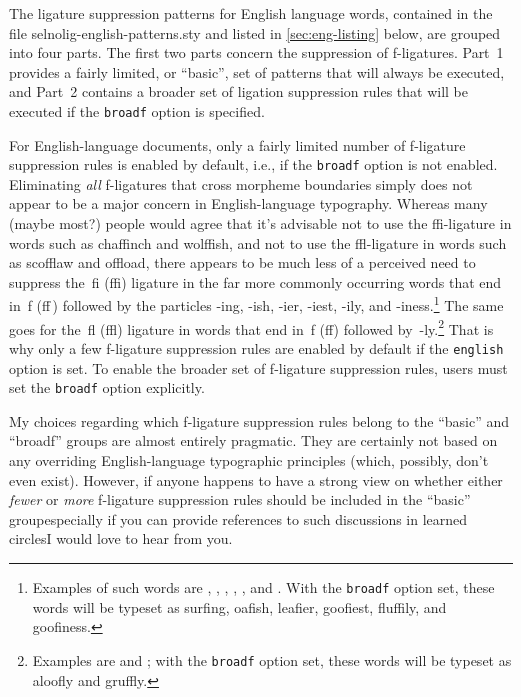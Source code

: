 \documentclass[11pt]{article}
\newcommand{\pkg}[1]{\textsf{#1}}
\newcommand{\opt}[1]{\texttt{#1}}
\begin{document}
The ligature suppression patterns for English language words, contained in the file \pkg{selnolig-english-patterns.sty} and listed in \cref{sec:eng-listing} below, are grouped into four parts. The first two parts concern the suppression of f-ligatures. Part~1 provides a fairly limited, or \enquote{basic}, set of patterns that will always be executed, and Part~2 contains a broader set of ligation suppression rules that will be executed if the \opt{broadf} option is specified. 

For English-language documents, only a fairly limited number of f-ligature suppression rules is enabled by default, i.e., if the \opt{broadf} option is not enabled. Eliminating \emph{all} f-ligatures that cross morpheme boundaries simply does not appear to be a major concern in English-language typography. Whereas many (maybe most?) people would agree that it's advisable not to use the ffi-ligature in words such as chaffinch and wolffish, and not to use the ffl-ligature in words such as scofflaw and offload, there appears to be much less of a perceived need to suppress the~fi (ffi) ligature in the far more commonly occurring words that end in~f (ff\,) followed by the particles -ing, -ish, -ier, -iest, -ily, and -iness.\footnote{Examples of such words are , , , , , and . With the \opt{broadf} option set, these words will be typeset as surfing, oafish, leafier, goofiest, fluffily, and goofiness.} The same goes for the~fl (ffl) ligature in words that end in~f (ff) followed by~-ly.\footnote{Examples are  and ; with the \opt{broadf} option set, these words will be typeset as aloofly and gruffly.} That is why only a few f-ligature suppression rules are enabled by default if the \opt{english} option is set. To enable the broader set of f-ligature suppression rules, users must set the \opt{broadf} option explicitly.

My choices regarding which f-ligature suppression rules belong to the \enquote{basic} and \enquote{broadf} groups are almost entirely pragmatic. They are certainly not based on any overriding English-language typographic principles (which, possibly, don't even exist). However, if anyone happens to have a strong view on whether either \emph{fewer} or \emph{more} f-ligature suppression rules should be included in the \enquote{basic} group\textemdash especially if you can provide references to such discussions in learned circles\textemdash I would love to hear from you.
\end{document}
